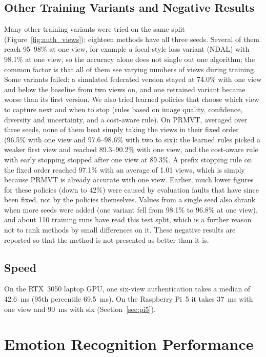 \subsection{Other Training Variants and Negative Results}
Many other training variants were tried on the same split (Figure~\ref{fig:auth_views}); eighteen methods have all three seeds. Several of them reach 95--98\% at one view, for example a focal-style loss variant (NDAL) \cite{focalloss} with 98.1\% at one view, so the accuracy alone does not single out one algorithm; the common factor is that all of them see varying numbers of views during training. Some variants failed: a simulated federated version stayed at 74.0\% with one view and below the baseline from two views on, and one retrained variant became worse than its first version. We also tried learned policies that choose which view to capture next and when to stop (rules based on image quality, confidence, diversity and uncertainty, and a cost-aware rule). On PRMVT, averaged over three seeds, none of them beat simply taking the views in their fixed order (96.5\% with one view and 97.6--98.6\% with two to six): the learned rules picked a weaker first view and reached 89.3--90.2\% with one view, and the cost-aware rule with early stopping stopped after one view at 89.3\%. A prefix stopping rule on the fixed order reached 97.1\% with an average of 1.01 views, which is simply because PRMVT is already accurate with one view. Earlier, much lower figures for these policies (down to 42\%) were caused by evaluation faults that have since been fixed, not by the policies themselves. Values from a single seed also shrank when more seeds were added (one variant fell from 98.1\% to 96.8\% at one view), and about 110 training runs have read this test split, which is a further reason not to rank methods by small differences on it. These negative results are reported so that the method is not presented as better than it is.

\subsection{Speed}
On the RTX~3050 laptop GPU, one six-view authentication takes a median of 42.6~ms (95th percentile 69.5~ms). On the Raspberry Pi~5 it takes 37~ms with one view and 90~ms with six (Section~\ref{sec:pi5}).

\section{Emotion Recognition Performance}

